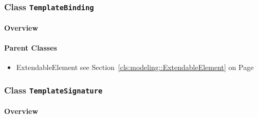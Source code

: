 \subsubsection{\Large{Class \bfseries \texttt{TemplateBinding}\normalfont}}
\label{cls:modeling::templates::TemplateBinding} 
\paragraph{Overview}

	



\paragraph{Parent Classes}
\begin{itemize}
\item ExtendableElement see Section~\ref{cls:modeling::ExtendableElement} on Page~\pageref{cls:modeling::ExtendableElement}\end{itemize}
\subsubsection{\Large{Class \bfseries \texttt{TemplateSignature}\normalfont}}
\label{cls:modeling::templates::TemplateSignature} 
\paragraph{Overview}

	



\newpage
